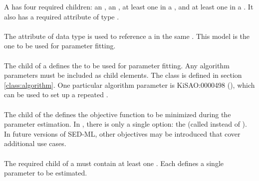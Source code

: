 

A \ParameterEstimationTask has four required children: an \Algorithm, an \Objective, at least one \AdjustableParameter in a \ListOfAdjustableParameters, and at least one \FitExperiment in a \ListOfFitExperiments.  It also has a required  attribute of type \SIdRef.

\paragraph*{}
The  attribute of data type \SIdRef is used to reference a \Model in the same \SedDocument.  This model is the one to be used for parameter fitting.


\paragraph*{}
The   child of a \ParameterEstimationTask {} defines the \Algorithm to be used for parameter fitting.  Any algorithm parameters must be included as child \AlgorithmParameter elements.  The \Algorithm class is defined in section \ref{class:algorithm}.  One particular algorithm parameter is KiSAO:0000498 (), which can be used to set up a repeated \ParameterEstimationTask.


\paragraph*{}
The  child of the \ParameterEstimationTask defines the objective function to be minimized during the parameter estimation.  In \currentLV, there is only a single \Objective option: the \LeastSquareObjectiveFunction (called  instead of ).  In future versions of SED-ML, other objectives may be introduced that cover additional use cases.


\paragraph*{}
The required \ListOfAdjustableParameters child of a \ParameterEstimationTask must contain at least one \AdjustableParameter.  Each \AdjustableParameter defines a single parameter to be estimated.


